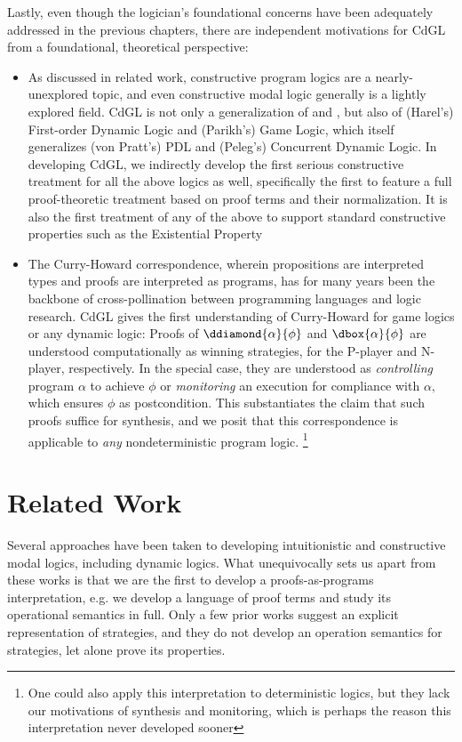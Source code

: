 \documentclass[12pt]{cmuthesis}
\theoremstyle{definition}
\theoremstyle{remark}
\newcommand{\CdGL}{\textsf{CdGL}\xspace}
\begin{document}
Lastly, even though the logician's foundational concerns have been adequately addressed in the previous chapters, there are independent motivations for \CdGL from a foundational, theoretical perspective:
\begin{itemize}
\item As discussed in related work, constructive program logics are a nearly-unexplored topic, and even constructive modal logic generally is a lightly explored field.
\CdGL is not only a generalization of  \dGL and \dL, but also of (Harel's) First-order Dynamic Logic and (Parikh's) Game Logic, which itself generalizes (von Pratt's) PDL and (Peleg's) Concurrent Dynamic Logic.
In developing \CdGL, we indirectly develop the first serious constructive treatment for all the above logics as well, specifically the first to feature a full proof-theoretic treatment based on proof terms and their normalization.
It is also the first treatment of any of the above to support standard constructive properties such as the Existential Property
\item
The Curry-Howard correspondence, wherein propositions are interpreted types and proofs are interpreted as programs,
has for many years been the backbone of cross-pollination between programming languages and logic research.
\CdGL gives the first understanding of Curry-Howard for game logics or any dynamic logic:
Proofs of $\ddiamond{\alpha}{\phi}$ and $\dbox{\alpha}{\phi}$ are understood computationally as winning strategies, for the P-player and N-player, respectively.
In the special case, they are understood as \emph{controlling} program $\alpha$ to achieve $\phi$ or \emph{monitoring} an execution for compliance with $\alpha,$ which ensures $\phi$ as postcondition.
This substantiates the claim that such proofs suffice for synthesis, and we posit that this correspondence is applicable to \emph{any} nondeterministic program logic.
\footnote{One could also apply this interpretation to deterministic logics, but they lack our motivations of synthesis and monitoring, which is perhaps the reason this interpretation never developed sooner}
\end{itemize}



\section{Related Work}
\newcommand{\semiset}[2]{\{#1~|~#2\}} 
Several approaches have been taken to developing intuitionistic and constructive modal logics, including dynamic logics.
What unequivocally sets us apart from these works is that we are the first to develop a proofs-as-programs interpretation, e.g. we develop a language of proof terms and study its operational semantics in full.
Only a few prior works suggest an explicit representation of strategies, and they do not develop an operation semantics for strategies, let alone prove its properties.
\end{document}
